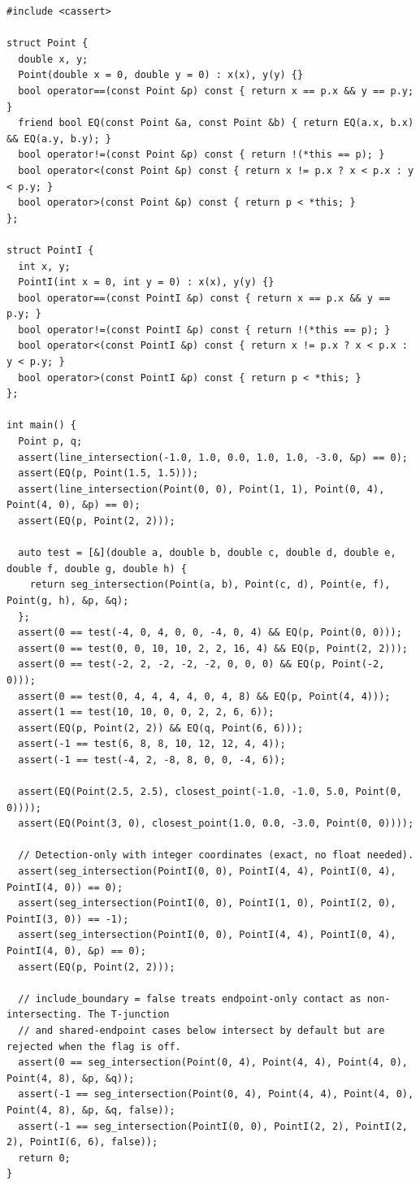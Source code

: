 \begin{lstlisting}[style=cpp]
#include <cassert>

struct Point {
  double x, y;
  Point(double x = 0, double y = 0) : x(x), y(y) {}
  bool operator==(const Point &p) const { return x == p.x && y == p.y; }
  friend bool EQ(const Point &a, const Point &b) { return EQ(a.x, b.x) && EQ(a.y, b.y); }
  bool operator!=(const Point &p) const { return !(*this == p); }
  bool operator<(const Point &p) const { return x != p.x ? x < p.x : y < p.y; }
  bool operator>(const Point &p) const { return p < *this; }
};

struct PointI {
  int x, y;
  PointI(int x = 0, int y = 0) : x(x), y(y) {}
  bool operator==(const PointI &p) const { return x == p.x && y == p.y; }
  bool operator!=(const PointI &p) const { return !(*this == p); }
  bool operator<(const PointI &p) const { return x != p.x ? x < p.x : y < p.y; }
  bool operator>(const PointI &p) const { return p < *this; }
};

int main() {
  Point p, q;
  assert(line_intersection(-1.0, 1.0, 0.0, 1.0, 1.0, -3.0, &p) == 0);
  assert(EQ(p, Point(1.5, 1.5)));
  assert(line_intersection(Point(0, 0), Point(1, 1), Point(0, 4), Point(4, 0), &p) == 0);
  assert(EQ(p, Point(2, 2)));

  auto test = [&](double a, double b, double c, double d, double e, double f, double g, double h) {
    return seg_intersection(Point(a, b), Point(c, d), Point(e, f), Point(g, h), &p, &q);
  };
  assert(0 == test(-4, 0, 4, 0, 0, -4, 0, 4) && EQ(p, Point(0, 0)));
  assert(0 == test(0, 0, 10, 10, 2, 2, 16, 4) && EQ(p, Point(2, 2)));
  assert(0 == test(-2, 2, -2, -2, -2, 0, 0, 0) && EQ(p, Point(-2, 0)));
  assert(0 == test(0, 4, 4, 4, 4, 0, 4, 8) && EQ(p, Point(4, 4)));
  assert(1 == test(10, 10, 0, 0, 2, 2, 6, 6));
  assert(EQ(p, Point(2, 2)) && EQ(q, Point(6, 6)));
  assert(-1 == test(6, 8, 8, 10, 12, 12, 4, 4));
  assert(-1 == test(-4, 2, -8, 8, 0, 0, -4, 6));

  assert(EQ(Point(2.5, 2.5), closest_point(-1.0, -1.0, 5.0, Point(0, 0))));
  assert(EQ(Point(3, 0), closest_point(1.0, 0.0, -3.0, Point(0, 0))));

  // Detection-only with integer coordinates (exact, no float needed).
  assert(seg_intersection(PointI(0, 0), PointI(4, 4), PointI(0, 4), PointI(4, 0)) == 0);
  assert(seg_intersection(PointI(0, 0), PointI(1, 0), PointI(2, 0), PointI(3, 0)) == -1);
  assert(seg_intersection(PointI(0, 0), PointI(4, 4), PointI(0, 4), PointI(4, 0), &p) == 0);
  assert(EQ(p, Point(2, 2)));

  // include_boundary = false treats endpoint-only contact as non-intersecting. The T-junction
  // and shared-endpoint cases below intersect by default but are rejected when the flag is off.
  assert(0 == seg_intersection(Point(0, 4), Point(4, 4), Point(4, 0), Point(4, 8), &p, &q));
  assert(-1 == seg_intersection(Point(0, 4), Point(4, 4), Point(4, 0), Point(4, 8), &p, &q, false));
  assert(-1 == seg_intersection(PointI(0, 0), PointI(2, 2), PointI(2, 2), PointI(6, 6), false));
  return 0;
}
\end{lstlisting}
